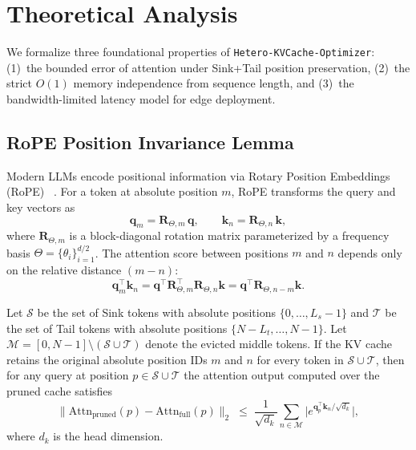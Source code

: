\section{Theoretical Analysis}
\label{sec:theory}

We formalize three foundational properties of \texttt{Hetero-KVCache-Optimizer}:
(1)~the bounded error of attention under Sink+Tail position preservation,
(2)~the strict $O(1)$ memory independence from sequence length, and
(3)~the bandwidth-limited latency model for edge deployment.

\subsection{RoPE Position Invariance Lemma}
\label{subsec:rope-lemma}

Modern LLMs encode positional information via Rotary Position Embeddings (RoPE)~
\cite{su2024roformer}.  For a token at absolute position $m$, RoPE transforms the
query and key vectors as
\begin{equation}
\mathbf{q}_m = \mathbf{R}_{\Theta,m} \, \mathbf{q}, \qquad
\mathbf{k}_n = \mathbf{R}_{\Theta,n} \, \mathbf{k},
\end{equation}
where $\mathbf{R}_{\Theta,m}$ is a block-diagonal rotation matrix parameterized by a
frequency basis $\Theta = \{\theta_i\}_{i=1}^{d/2}$.  The attention score between
positions $m$ and $n$ depends only on the relative distance $(m-n)$:
\begin{equation}
\mathbf{q}_m^{\top} \mathbf{k}_n
= \mathbf{q}^{\top} \mathbf{R}_{\Theta,m}^{\top} \mathbf{R}_{\Theta,n} \mathbf{k}
= \mathbf{q}^{\top} \mathbf{R}_{\Theta,n-m} \mathbf{k}.
\end{equation}

\begin{lemma}
\label{lem:rope}
Let $\mathcal{S}$ be the set of Sink tokens with absolute positions
$\{0, \dots, L_s-1\}$ and $\mathcal{T}$ be the set of Tail tokens with absolute
positions $\{N-L_t, \dots, N-1\}$.  Let $\mathcal{M} = [0,N-1] \setminus
(\mathcal{S} \cup \mathcal{T})$ denote the evicted middle tokens.  If the KV cache
retains the original absolute position IDs $m$ and $n$ for every token in
$\mathcal{S} \cup \mathcal{T}$, then for any query at position
$p \in \mathcal{S} \cup \mathcal{T}$ the attention output computed over the pruned
cache satisfies
\begin{equation}
\bigl\| \text{Attn}_{\text{pruned}}(p) - \text{Attn}_{\text{full}}(p) \bigr\|_2
\;\le\;
\frac{1}{\sqrt{d_k}} \sum_{n \in \mathcal{M}}
\bigl| e^{\mathbf{q}_p^{\top} \mathbf{k}_n / \sqrt{d_k}} \bigr|,
\label{eq:rope-bound}
\end{equation}
where $d_k$ is the head dimension.
\end{lemma}

